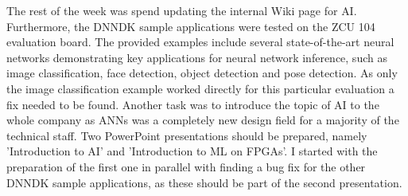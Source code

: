 The rest of the week was spend updating the internal Wiki page for \ac{AI}. Furthermore, the \ac{DNNDK} sample applications were tested on the ZCU 104 evaluation board. The provided examples include several state-of-the-art neural networks demonstrating key applications for neural network inference, such as image classification, face detection, object detection and pose detection. As only the image classification example worked directly for this particular evaluation a fix needed to be found. Another task was to introduce the topic of \ac{AI} to the whole company as \acp{ANN} was a completely new design field for a majority of the technical staff. Two PowerPoint presentations should be prepared, namely 'Introduction to \ac{AI}' and 'Introduction to \ac{ML} on \acp{FPGA}'. I started with the preparation of the first one in parallel with finding a bug fix for the other \ac{DNNDK} sample applications, as these should be part of the second presentation.